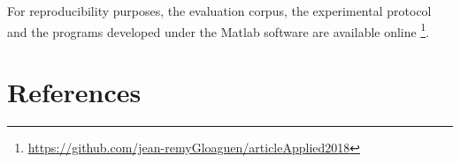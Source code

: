 \documentclass[review,5p,twocolumn,sort&compress,times]{elsarticle}
\begin{document}
For reproducibility purposes, the evaluation corpus, the experimental protocol and the programs developed under the Matlab software are available online \footnote{\url{https://github.com/jean-remyGloaguen/articleApplied2018}}. 


\section*{References}


\end{document}
